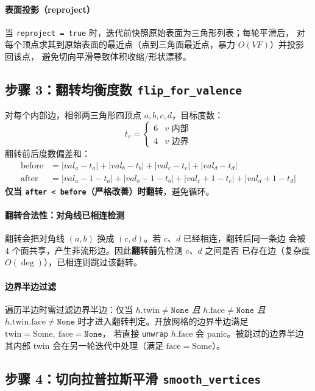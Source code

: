 \documentclass[11pt,a4paper]{article}
\begin{document}
\paragraph{表面投影（reproject）}
当 \texttt{reproject = true} 时，迭代前快照原始表面为三角形列表；每轮平滑后，
对每个顶点求其到原始表面的最近点（点到三角面最近点，暴力 $O(VF)$）并投影回该点，
避免切向平滑导致体积收缩/形状漂移。

\subsection{步骤 3：翻转均衡度数 \texttt{flip\_for\_valence}}

对每个内部边，相邻两三角形四顶点 $a, b, c, d$，目标度数：
\[
  t_v = \begin{cases} 6 & v \text{ 内部} \\ 4 & v \text{ 边界} \end{cases}
\]
翻转前后度数偏差和：
\begin{align}
  \text{before} &= |val_a - t_a| + |val_b - t_b| + |val_c - t_c| + |val_d - t_d| \\
  \text{after}  &= |val_a - 1 - t_a| + |val_b - 1 - t_b| + |val_c + 1 - t_c| + |val_d + 1 - t_d|
\end{align}
\textbf{仅当 \texttt{after < before}（严格改善）时翻转}，避免循环。

\paragraph{翻转合法性：对角线已相连检测}
翻转会把对角线 $(a,b)$ 换成 $(c,d)$。若 $c$、$d$ 已经相连，翻转后同一条边
会被 $4$ 个面共享，产生非流形边。因此\textbf{翻转前}先检测 $c$、$d$ 之间是否
已存在边（复杂度 $O(\deg)$），已相连则跳过该翻转。

\paragraph{边界半边过滤}
遍历半边时需过滤边界半边：仅当 $h.\mathrm{twin} \neq \texttt{None}$
\emph{且} $h.\mathrm{face} \neq \texttt{None}$ \emph{且} $h.\mathrm{twin}.\mathrm{face} \neq \texttt{None}$
时才进入翻转判定。开放网格的边界半边满足 $\mathrm{twin}=\text{Some},\ \mathrm{face}=\texttt{None}$，
若直接 \texttt{unwrap} $h.\mathrm{face}$ 会 panic。被跳过的边界半边其内部 twin
会在另一轮迭代中处理（满足 $\mathrm{face}=\text{Some}$）。

\subsection{步骤 4：切向拉普拉斯平滑 \texttt{smooth\_vertices}}
\end{document}
